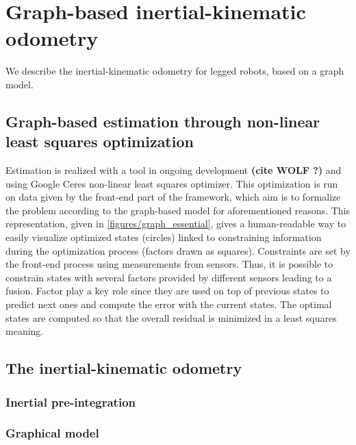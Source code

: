 
\section{Graph-based inertial-kinematic odometry}

We describe the inertial-kinematic odometry for legged robots, based on a graph model. 

\subsection{Graph-based estimation through non-linear least squares optimization}

Estimation is realized with a tool in ongoing development \textbf{(cite WOLF ?)} and using Google Ceres non-linear least squares optimizer. This optimization is run on data given by the front-end part of the framework,
which aim is to formalize the problem according to the graph-based model for aforementioned reasons. This representation, given in \ref{figures/graph_essential}, 
gives a human-readable way to easily visualize optimized states (circles) linked to constraining information during the optimization process (factors drawn as squares). Constraints are set by the front-end process using measurements from sensors.
Thus, it is possible to constrain states with several factors provided by different sensors leading to a fusion. Factor play a key role since they are used on top of previous states to predict next ones and compute the error with the current states.
The optimal states are computed so that the overall residual is minimized in a least squares meaning.

\subsection{The inertial-kinematic odometry}
\subsubsection{Inertial pre-integration}
\subsubsection{Graphical model}

